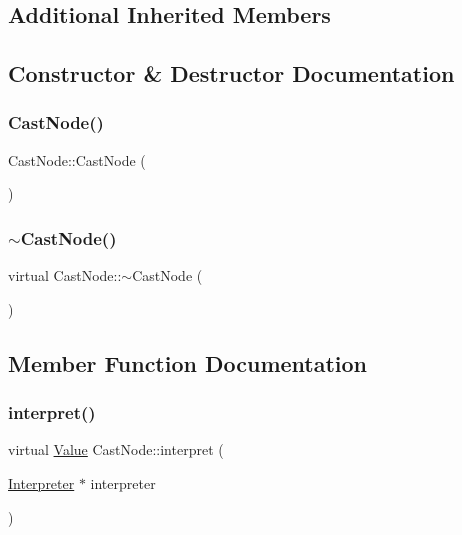 \subsection*{Additional Inherited Members}


\subsection{Constructor \& Destructor Documentation}
\mbox{\label{classCastNode_aacc7aea8e67a26de47f9a9a175cad3e2}} 
\subsubsection{\texorpdfstring{Cast\+Node()}{CastNode()}}
{\footnotesize\ttfamily Cast\+Node\+::\+Cast\+Node (\begin{DoxyParamCaption}{ }\end{DoxyParamCaption})}

\mbox{\label{classCastNode_a358bc9d180542920fced2b7f35ef3f9f}} 
\subsubsection{\texorpdfstring{$\sim$\+Cast\+Node()}{~CastNode()}}
{\footnotesize\ttfamily virtual Cast\+Node\+::$\sim$\+Cast\+Node (\begin{DoxyParamCaption}{ }\end{DoxyParamCaption})\hspace{0.3cm}{\ttfamily [virtual]}}



\subsection{Member Function Documentation}
\mbox{\label{classCastNode_a2a909a7531791bcbc53c514a01ce5024}} 
\subsubsection{\texorpdfstring{interpret()}{interpret()}}
{\footnotesize\ttfamily virtual \hyperlink{classValue}{Value} Cast\+Node\+::interpret (\begin{DoxyParamCaption}\item[{\hyperlink{classInterpreter}{Interpreter} $\ast$}]{interpreter }\end{DoxyParamCaption})\hspace{0.3cm}{\ttfamily [virtual]}}



